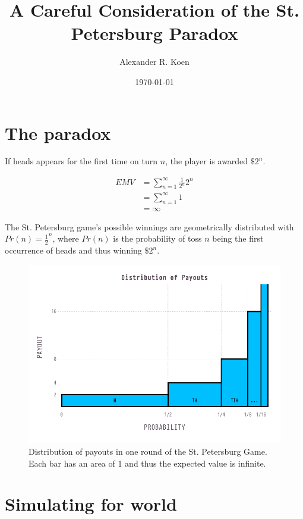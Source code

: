\documentclass{article}
\title{A Careful Consideration of the St. Petersburg Paradox}
\author{Alexander R. Koen}
\date{\today}
\begin{document}
\maketitle

\section{The paradox}

If heads appears for the first time on turn $n$, the player is awarded $\$2^n$.


\begin{align*}
\label{eq:1}
  EMV &= \sum_{n=1}^{\infty} \frac{1}{2^{n}}2^n \\
      &= \sum_{n=1}^{\infty}1 \\
      &= \infty
\end{align*}

The St. Petersburg game's possible winnings are geometrically distributed with $Pr(n)=\frac{1}{2}^{n}$, where $Pr(n)$ is the probability of toss $n$ being the first occurrence of heads and thus winning $\$2^n$.

\begin{figure}[htb]
  \centering
  \includegraphics{distribution}
  \caption{Distribution of payouts in one round of the St. Petersburg Game. Each bar has an area of 1 and thus the expected value is infinite.}
  \label{fig:distribution}
\end{figure}

\section{Simulating for world}
\end{document}
